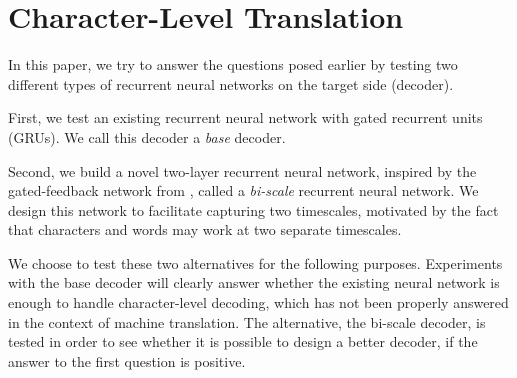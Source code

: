 \documentclass[11pt]{article}
\begin{document}
\section{Character-Level Translation}
\label{sec:char_trans}

In this paper, we try to answer the questions posed earlier by testing two
different types of recurrent neural networks on the target side (decoder).

First, we test an existing recurrent neural network with gated recurrent units
(GRUs). We call this decoder a {\em base} decoder.

Second, we build a novel two-layer recurrent neural network, inspired by the
gated-feedback network from , called a {\em bi-scale}
recurrent neural network. 
We design this network to facilitate capturing two timescales, motivated by the
fact that characters and words may work at two separate timescales.

We choose to test these two alternatives for the following purposes. Experiments
with the base decoder will clearly answer whether the existing neural network is
enough to handle character-level decoding, which has not been properly answered
in the context of machine translation. The alternative, the bi-scale decoder, is
tested in order to see whether it is possible to design a better decoder, if the
answer to the first question is positive.
\end{document}
